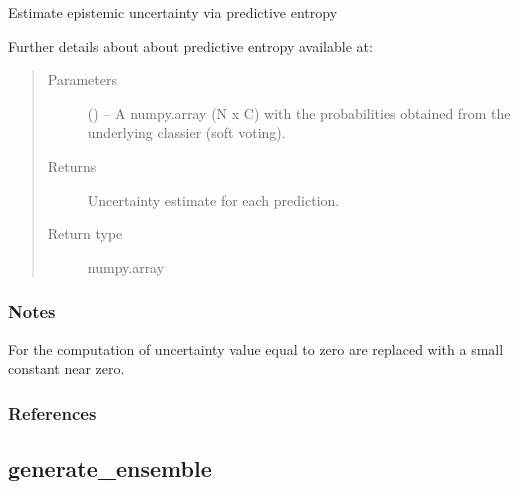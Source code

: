 \documentclass[a4paper,10pt,english]{sphinxmanual}
\begin{document}
\begin{fulllineitems}
\label{\detokenize{api/ucf.compute_predictive_entropy:ucf.compute_predictive_entropy}}
Estimate epistemic uncertainty via predictive entropy %
\begin{footnote}[1]\sphinxAtStartFootnote
Further details about about predictive entropy available at:
%
\end{footnote}
\begin{quote}\begin{description}
\item[{Parameters}] \leavevmode
{} () -- A numpy.array (N x C) with the probabilities obtained from the
underlying classier (soft voting).

\item[{Returns}] \leavevmode
Uncertainty estimate for each prediction.

\item[{Return type}] \leavevmode
numpy.array

\end{description}\end{quote}
\subsubsection*{Notes}

For the computation of uncertainty value equal to zero are
replaced with a small constant near zero.
\subsubsection*{References}

\end{fulllineitems}



\subsection{generate\_ensemble}
\label{\detokenize{api/ucf.generate_ensemble:generate-ensemble}}\label{\detokenize{api/ucf.generate_ensemble::doc}}
\end{document}

